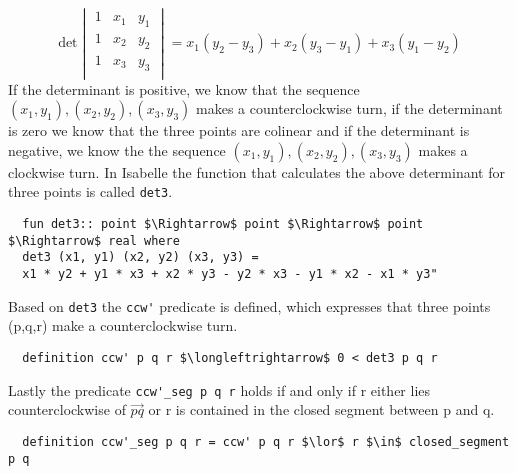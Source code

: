 \[
\text{det} 
\begin{vmatrix}
1 & x_1 & y_1 \\
1 & x_2 & y_2 \\
1 & x_3 & y_3 \\
\end{vmatrix}
= x_1 (y_2 - y_3 ) + x_2 (y_3 - y_1)+ x_3  (y_1 - y_2)
\]
If the determinant is positive, we know that the sequence $(x_1,y_1), (x_2,y_2) , (x_3,y_3)$
makes a counterclockwise turn, if the determinant is zero we know that the three points are colinear 
and if the determinant is negative, we know the the sequence $(x_1,y_1), (x_2,y_2) , (x_3,y_3)$
makes a clockwise turn. %
In Isabelle the function that calculates the above determinant for three 
points is called \lstinline|det3|.
\begin{lstlisting}
  fun det3:: point $\Rightarrow$ point $\Rightarrow$ point $\Rightarrow$ real where 
  det3 (x1, y1) (x2, y2) (x3, y3) =
  x1 * y2 + y1 * x3 + x2 * y3 - y2 * x3 - y1 * x2 - x1 * y3"
\end{lstlisting}
Based on \lstinline|det3| the \lstinline|ccw'| predicate is defined, which expresses that 
three points (p,q,r) make a counterclockwise turn.
\begin{lstlisting}
  definition ccw' p q r $\longleftrightarrow$ 0 < det3 p q r
\end{lstlisting}
Lastly the predicate \lstinline|ccw'_seg p q r| holds if and only if r either lies 
counterclockwise of $\vec{pq}$ or r is contained in the closed segment between p and q.
\begin{lstlisting}
  definition ccw'_seg p q r = ccw' p q r $\lor$ r $\in$ closed_segment p q
\end{lstlisting}



